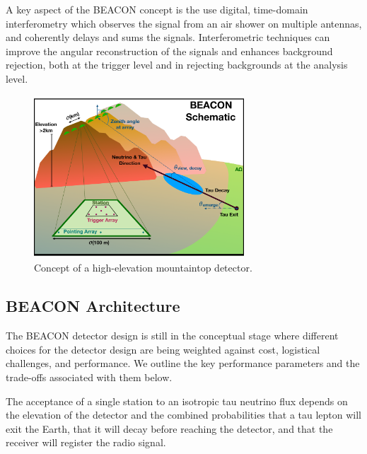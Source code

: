 \documentclass[12pt]{article}
\begin{document}
A key aspect of the BEACON concept is the use digital, time-domain interferometry which observes the signal from an air shower on multiple antennas, and coherently delays and sums the signals. Interferometric techniques can improve the angular reconstruction of the signals and enhances background rejection, both at the trigger level and in rejecting backgrounds at the analysis level. 

\begin{figure}[htbp]
\begin{center}
\includegraphics[width=0.7\textwidth]{figures/BEACON_ICRC_Concept.pdf}
\caption{Concept of a high-elevation mountaintop detector.}
\label{fig:concept}
\end{center}
\end{figure}

\subsection{BEACON Architecture}

The BEACON detector design is still in the conceptual stage where different choices for the detector design are being weighted against cost, logistical challenges, and performance. We outline the key performance parameters and the trade-offs associated with them below.

The acceptance of a single station to an isotropic tau neutrino flux depends on the elevation of the detector and the combined probabilities that a tau lepton will exit the Earth, that it will decay before reaching the detector, and that the receiver will register the radio signal. 
\end{document}
